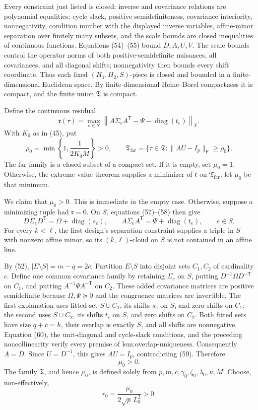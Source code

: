 Every constraint just listed is closed: inverse and covariance relations are polynomial equalities; cycle slack, positive semidefiniteness, covariance interiority, nonnegativity, condition number with the displayed inverse variables, affine-minor separation over finitely many subsets, and the scale bounds are closed inequalities of continuous functions. Equations (54)--(55) bound \(D,A,U,V\). The scale bounds control the operator norms of both positive-semidefinite nuisances, all covariances, and all diagonal shifts; nonnegativity then bounds every shift coordinate. Thus each fixed \((H_1,H_2,S)\)-piece is closed and bounded in a finite-dimensional Euclidean space. By finite-dimensional Heine--Borel compactness it is compact, and the finite union \(\mathfrak T\) is compact.

Define the continuous residual
\[
\mathfrak r(\tau)=
\max_{e\in S}
\left\|A\Sigma_eA^{\mathsf T}-\Psi-\operatorname{diag}(t_e)\right\|_{\mathrm F}.
\tag{58}
\]
With \(K_0\) as in (45), put
\[
\rho_0=\min\left\{1,\frac{1}{2K_0\overline M}\right\}>0,
\qquad
\mathfrak T_{\mathrm{far}}
=\{\tau\in\mathfrak T:\|AU-I_p\|_{\mathrm F}\geq\rho_0\}.
\tag{59}
\]
The far family is a closed subset of a compact set. If it is empty, set \(\mu_0=1\). Otherwise, the extreme-value theorem supplies a minimizer of \(\mathfrak r\) on \(\mathfrak T_{\mathrm{far}}\); let \(\mu_0\) be that minimum.

We claim that \(\mu_0>0\). This is immediate in the empty case. Otherwise, suppose a minimizing tuple had \(\mathfrak r=0\). On \(S\), equations (57)--(58) then give
\[
D\Sigma_eD^{\mathsf T}=\Omega+\operatorname{diag}(s_e),
\qquad
A\Sigma_eA^{\mathsf T}=\Psi+\operatorname{diag}(t_e),
\qquad e\in S.
\tag{60}
\]
For every \(k<\ell\), the first design's separation constraint supplies a triple in \(S\) with nonzero affine minor, so its \((k,\ell)\)-cloud on \(S\) is not contained in an affine line.

By (52), \(|E\setminus S|=m-q=2c\). Partition \(E\setminus S\) into disjoint sets \(C_1,C_2\) of cardinality \(c\). Define one common covariance family by retaining \(\Sigma_e\) on \(S\), putting \(D^{-1}\Omega D^{-\mathsf T}\) on \(C_1\), and putting \(A^{-1}\Psi A^{-\mathsf T}\) on \(C_2\). These added covariance matrices are positive semidefinite because \(\Omega,\Psi\succeq0\) and the congruence matrices are invertible. The first explanation uses fitted set \(S\cup C_1\), its shifts \(s_e\) on \(S\), and zero shifts on \(C_1\); the second uses \(S\cup C_2\), its shifts \(t_e\) on \(S\), and zero shifts on \(C_2\). Both fitted sets have size \(q+c=h\), their overlap is exactly \(S\), and all shifts are nonnegative. Equation (60), the unit-diagonal and cycle-slack conditions, and the preceding noncollinearity verify every premise of \(\text{lem:overlap-uniqueness}\). Consequently \(A=D\). Since \(U=D^{-1}\), this gives \(AU=I_p\), contradicting (59). Therefore
\[
\mu_0>0.
\tag{61}
\]
The family \(\mathfrak T\), and hence \(\mu_0\), is defined solely from \(p,m,c,\gamma_0,\zeta_0,\lambda_0,\overline\kappa,\overline M\). Choose, non-effectively,
\[
r_0=\frac{\mu_0}{2\sqrt p\,L_0^2}>0.
\tag{62}
\]

